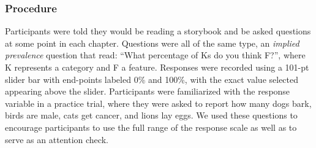 \documentclass[10pt,letterpaper]{article}
\newcommand{\red}[1]{{\textcolor{Red}{#1}}}
\begin{document}

\subsubsection{Procedure}
Participants were told they would be reading a storybook and be asked questions at some point in each chapter. 
Questions were all of the same type, an \emph{implied prevalence} question \cite{Gelman2002, Cimpian2010} that read: ``What percentage of Ks do you think F?'', where K represents a category and F a feature. 
Responses were recorded using a 101-pt slider bar with end-points labeled 0\% and 100\%, with the exact value selected appearing above the slider. 
Participants were familiarized with the response variable in a practice trial, where they were asked to report how many dogs bark, birds are male, cats get cancer, and lions lay eggs. 
We used these questions to encourage participants to use the full range of the response scale as well as to serve as an attention check. 
\end{document}
